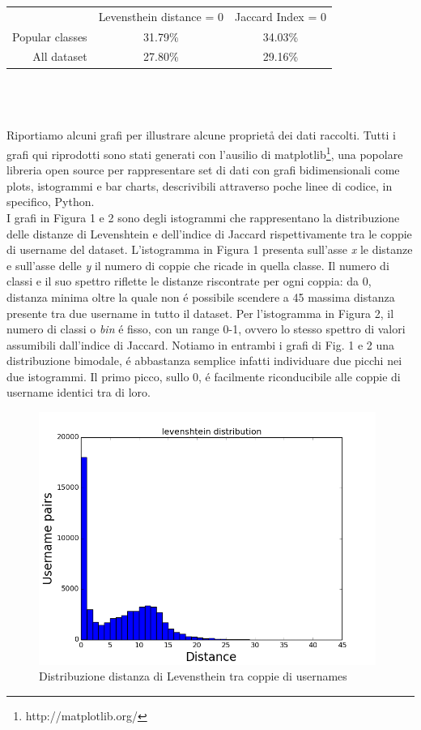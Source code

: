 \begin{tabular}{ r|c|c| }
\multicolumn{1}{r}{}
 &  \multicolumn{1}{c}{Levensthein distance = 0}
 & \multicolumn{1}{c}{Jaccard Index = 0 } \\
\cline{2-3}
Popular classes & 31.79\% & 34.03\% \\
\cline{2-3}
All dataset & 27.80\% & 29.16\% \\
\cline{2-3}
\end{tabular}
\\\\\\
Riportiamo alcuni grafi per illustrare alcune proprietå dei dati raccolti.
Tutti i grafi qui riprodotti sono stati generati con l’ausilio di matplotlib\footnote{http://matplotlib.org/}, una popolare libreria open source per rappresentare set di dati con grafi bidimensionali come plots, istogrammi e bar charts, descrivibili attraverso poche linee di codice, in specifico, Python. \\

I grafi in Figura 1 e 2 sono degli istogrammi che rappresentano la distribuzione delle distanze di Levenshtein e dell'indice di Jaccard rispettivamente tra le coppie di username del dataset.
L'istogramma in Figura 1 presenta sull'asse \textit{x} le distanze e sull'asse delle \textit{y} il numero di coppie che ricade in quella classe. Il numero di classi e il suo spettro riflette le distanze riscontrate per ogni coppia: da 0, distanza minima oltre la quale non é possibile scendere a 45 massima distanza presente tra due username in tutto il dataset. Per l'istogramma in Figura 2, il numero di classi o \textit{bin} é fisso, con un range 0-1, ovvero lo stesso spettro di valori assumibili dall'indice di Jaccard.
Notiamo in entrambi i grafi di Fig. 1 e 2 una distribuzione bimodale, é abbastanza semplice infatti individuare due picchi nei due istogrammi. Il primo picco, sullo 0, é facilmente riconducibile alle coppie di username identici tra di loro.

\begin{figure}[bp!]
\centering
\includegraphics[width=110mm]{chapters/distanceplot/levenshtein_distribution.png}
\caption{Distribuzione distanza di Levensthein tra coppie di usernames  \label{overflow}}
\end{figure}

